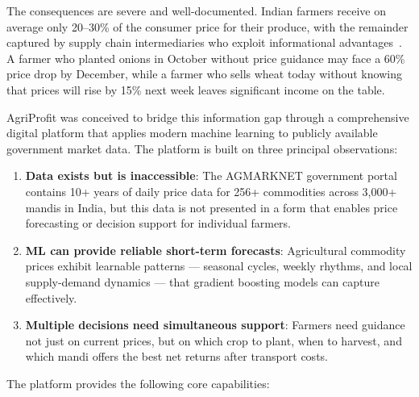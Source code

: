 \documentclass[12pt,a4paper]{report}
\begin{document}
The consequences are severe and well-documented. Indian farmers receive on average only
20--30\% of the consumer price for their produce, with the remainder captured by supply
chain intermediaries who exploit informational advantages~\cite{farmersIncome}. A farmer
who planted onions in October without price guidance may face a 60\% price drop by December,
while a farmer who sells wheat today without knowing that prices will rise by 15\% next week
leaves significant income on the table.

AgriProfit was conceived to bridge this information gap through a comprehensive digital
platform that applies modern machine learning to publicly available government market data.
The platform is built on three principal observations:

\begin{enumerate}
    \item \textbf{Data exists but is inaccessible}: The AGMARKNET government portal contains
    10+ years of daily price data for 256+ commodities across 3,000+ mandis in India, but
    this data is not presented in a form that enables price forecasting or decision support
    for individual farmers.
    \item \textbf{ML can provide reliable short-term forecasts}: Agricultural commodity prices
    exhibit learnable patterns --- seasonal cycles, weekly rhythms, and local supply-demand
    dynamics --- that gradient boosting models can capture effectively.
    \item \textbf{Multiple decisions need simultaneous support}: Farmers need guidance not
    just on current prices, but on which crop to plant, when to harvest, and which mandi
    offers the best net returns after transport costs.
\end{enumerate}

The platform provides the following core capabilities:
\end{document}
